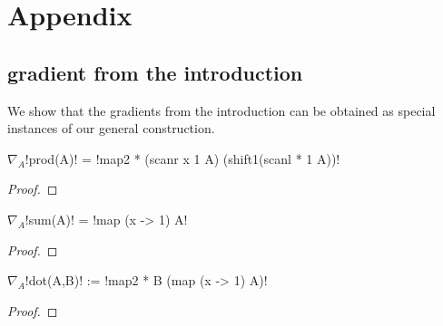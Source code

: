 \section{Appendix}

\subsection{gradient from the introduction}

We show that the gradients from the introduction 
can be obtained as special instances of our general construction. 

\begin{lemma}
    $\nabla_A$!prod(A)! = !map2 * (scanr x 1 A) (shift1(scanl * 1 A))!
\end{lemma}

\begin{proof}
    
\end{proof}

\begin{lemma}
    $\nabla_A$!sum(A)! = !map (x -> 1) A!
\end{lemma}

\begin{proof}
    
\end{proof}

\begin{lemma}
    $\nabla_A$!dot(A,B)! := !map2 * B (map (x -> 1) A)! 
\end{lemma}

\begin{proof}
    
\end{proof}